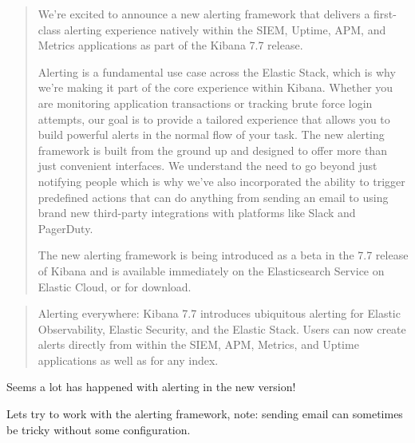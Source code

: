 \documentclass[Screen16to9,17pt]{foils}
\begin{document}


\begin{quote}\small
We’re excited to announce a new alerting framework that delivers a first-class alerting experience natively within the SIEM, Uptime, APM, and Metrics applications as part of the Kibana 7.7 release.

Alerting is a fundamental use case across the Elastic Stack, which is why we’re making it part of the core experience within Kibana. Whether you are monitoring application transactions or tracking brute force login attempts, our goal is to provide a tailored experience that allows you to build powerful alerts in the normal flow of your task. The new alerting framework is built from the ground up and designed to offer more than just convenient interfaces. We understand the need to go beyond just notifying people which is why we’ve also incorporated the ability to trigger predefined actions that can do anything from sending an email to using brand new third-party integrations with platforms like Slack and PagerDuty.

The new alerting framework is being introduced as a beta in the 7.7 release of Kibana and is available immediately on the Elasticsearch Service on Elastic Cloud, or for download.
\end{quote}

\begin{list2}
\item {\footnotesize{}}
\item {\footnotesize{}}
\item {\footnotesize{}}
\end{list2}




\begin{quote}
Alerting everywhere: Kibana 7.7 introduces ubiquitous alerting for Elastic Observability, Elastic Security, and the Elastic Stack. Users can now create alerts directly from within the SIEM, APM, Metrics, and Uptime applications as well as for any index.
\end{quote}

\begin{list2}
\item Seems a lot has happened with alerting in the new version!
\item Lets try to work with the alerting framework, note: sending email can sometimes be tricky without some configuration.
\end{list2}
\end{document}
